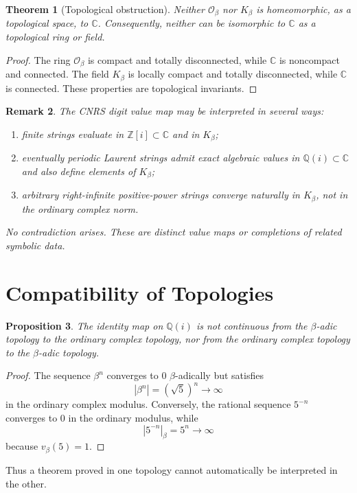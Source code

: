 \documentclass[11pt]{article}
\newtheorem{theorem}{Theorem}[section]
\newtheorem{proposition}[theorem]{Proposition}
\newtheorem{remark}[theorem]{Remark}
\newcommand{\Z}{\mathbb Z}
\newcommand{\Q}{\mathbb Q}
\newcommand{\C}{\mathbb C}
\newcommand{\Zi}{\Z[i]}
\newcommand{\Qi}{\Q(i)}
\newcommand{\Ob}{\mathcal O_\beta}
\newcommand{\Kb}{K_\beta}
\begin{document}
\begin{theorem}[Topological obstruction]
Neither $\Ob$ nor $\Kb$ is homeomorphic, as a topological space, to $\C$.  Consequently, neither can be isomorphic to $\C$ as a topological ring or field.
\end{theorem}

\begin{proof}
The ring $\Ob$ is compact and totally disconnected, while $\C$ is noncompact and connected.  The field $\Kb$ is locally compact and totally disconnected, while $\C$ is connected.  These properties are topological invariants.
\end{proof}

\begin{remark}
The CNRS digit value map may be interpreted in several ways:
\begin{enumerate}[label=(\roman*)]
\item finite strings evaluate in $\Zi\subset\C$ and in $\Kb$;
\item eventually periodic Laurent strings admit exact algebraic values in $\Qi\subset\C$ and also define elements of $\Kb$;
\item arbitrary right-infinite positive-power strings converge naturally in $\Kb$, not in the ordinary complex norm.
\end{enumerate}
No contradiction arises.  These are distinct value maps or completions of related symbolic data.
\end{remark}

\section{Compatibility of Topologies}

\begin{proposition}
The identity map on $\Qi$ is not continuous from the $\beta$-adic topology to the ordinary complex topology, nor from the ordinary complex topology to the $\beta$-adic topology.
\end{proposition}

\begin{proof}
The sequence $\beta^n$ converges to $0$ $\beta$-adically but satisfies
\[
|\beta^n|=(\sqrt5)^n\to\infty
\]
in the ordinary complex modulus.  Conversely, the rational sequence $5^{-n}$ converges to $0$ in the ordinary modulus, while
\[
|5^{-n}|_\beta=5^n\to\infty
\]
because $v_\beta(5)=1$.
\end{proof}

Thus a theorem proved in one topology cannot automatically be interpreted in the other.
\end{document}

